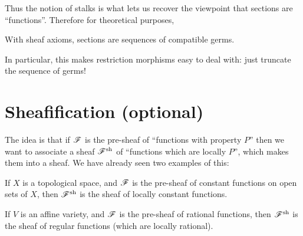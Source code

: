Thus the notion of stalks is what lets us recover the viewpoint
that sections are ``functions''.  Therefore for theoretical purposes,
\begin{moral}
	With sheaf axioms, sections are sequences of compatible germs.
\end{moral}
In particular, this makes restriction morphisms easy to deal with:
just truncate the sequence of germs!

\section{Sheafification (optional)}

The idea is that if $\mathscr F$ is the pre-sheaf of ``functions with property $P$''
then we want to associate a sheaf $\mathscr F^\mathrm{sh}$ of
``functions which are locally $P$'', which makes them into a sheaf.
We have already seen two examples of this:
\begin{example}
	[Sheafification]
	\listhack
	\begin{enumerate}[(a)]
		\ii If $X$ is a topological space,
		and $\mathscr F$ is the pre-sheaf of constant functions on open sets of $X$,
		then $\mathscr F^\mathrm{sh}$ is the sheaf of locally constant functions.

		\ii If $V$ is an affine variety,
		and $\mathscr F$ is the pre-sheaf of rational functions,
		then $\mathscr F^\mathrm{sh}$ is the sheaf of regular functions
		(which are locally rational).
	\end{enumerate}
\end{example}

